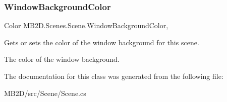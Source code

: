 \subsubsection{\texorpdfstring{Window\+Background\+Color}{WindowBackgroundColor}}
{\footnotesize\ttfamily Color M\+B2\+D.\+Scenes.\+Scene.\+Window\+Background\+Color\hspace{0.3cm}{\ttfamily [get]}, {\ttfamily [set]}}



Gets or sets the color of the window background for this scene. 

The color of the window background.

The documentation for this class was generated from the following file\+:\begin{DoxyCompactItemize}
\item 
M\+B2\+D/src/\+Scene/Scene.\+cs\end{DoxyCompactItemize}
